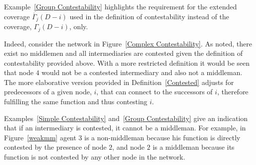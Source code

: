 \documentclass[11pt,fleqn]{article}
\begin{document}
\noindent
Example~\ref{Group Contestability} highlights the requirement for the extended coverage $\overline{\Gamma}_{j}(D - i)$ used in the definition of contestability instead of the coverage, $\Gamma_{j}(D - i)$, only.

Indeed, consider the network in Figure~\ref{Complex Contestability}. As noted, there exist no middlemen and all intermediaries are contested given the definition of contestability provided above. With a more restricted definition it would be seen that node $4$ would not be a contested intermediary and also not a middleman. The more elaborative version provided in Definition~\ref{Contested} adjusts for predecessors of a given node, $i$, that can connect to the successors of $i$, therefore fulfilling the same function and thus contesting $i$.

Examples~\ref{Simple Contestability} and~\ref{Group Contestability} give an indication that if an intermediary is contested, it cannot be a middleman. For example, in Figure~\ref{weakmm} agent $3$ is a non-middleman because his function is directly contested by the presence of node $2$, and node $2$ is a middleman because its function is not contested by any other node in the network.
\end{document}
